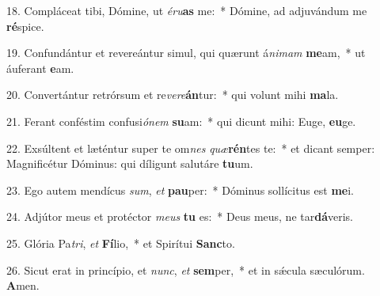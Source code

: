 18. Compláceat tibi, Dómine, ut \textit{é}\textit{ru}\textbf{as} me:~*  Dómine, ad adjuvándum me \textbf{ré}spice.\

19. Confundántur et revereántur simul, qui quærunt á\textit{ni}\textit{mam} \textbf{me}am,~*  ut áuferant \textbf{e}am.\

20. Convertántur retrórsum et re\textit{ve}\textit{re}\textbf{án}tur:~*  qui volunt mihi \textbf{ma}la.\

21. Ferant conféstim confusi\textit{ó}\textit{nem} \textbf{su}am:~*  qui dicunt mihi: Euge, \textbf{eu}ge.\

22. Exsúltent et læténtur super te om\textit{nes} \textit{quæ}\textbf{rén}tes te:~*  et dicant semper: Magnificétur Dóminus: qui díligunt salutáre \textbf{tu}um.\

23. Ego autem mendícus \textit{sum}, \textit{et} \textbf{pau}per:~*  Dóminus sollícitus est \textbf{me}i.\

24. Adjútor meus et protéctor \textit{me}\textit{us} \textbf{tu} es:~*  Deus meus, ne tar\textbf{dá}veris.\

25. Glória Pa\textit{tri}, \textit{et} \textbf{Fí}lio,~*  et Spirítui \textbf{Sanc}to.\

26. Sicut erat in princípio, et \textit{nunc}, \textit{et} \textbf{sem}per,~*  et in sǽcula sæculórum. \textbf{A}men.\

